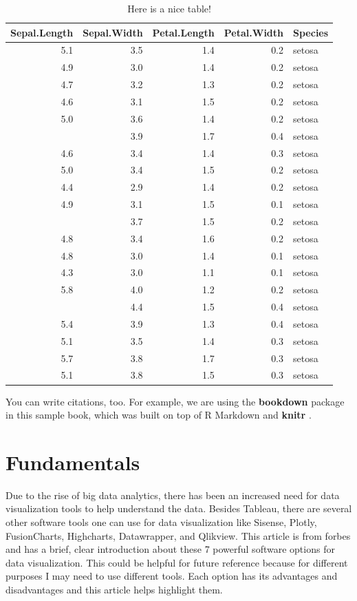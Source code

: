 \documentclass[]{book}
\theoremstyle{definition}
\theoremstyle{definition}
\theoremstyle{definition}
\theoremstyle{remark}
\begin{document}
\begin{table}

\caption{\label{tab:nice-tab}Here is a nice table!}
\centering
\begin{tabular}[t]{rrrrl}
\toprule
Sepal.Length & Sepal.Width & Petal.Length & Petal.Width & Species\\
\midrule
5.1 & 3.5 & 1.4 & 0.2 & setosa\\
4.9 & 3.0 & 1.4 & 0.2 & setosa\\
4.7 & 3.2 & 1.3 & 0.2 & setosa\\
4.6 & 3.1 & 1.5 & 0.2 & setosa\\
5.0 & 3.6 & 1.4 & 0.2 & setosa\\
\addlinespace
5.4 & 3.9 & 1.7 & 0.4 & setosa\\
4.6 & 3.4 & 1.4 & 0.3 & setosa\\
5.0 & 3.4 & 1.5 & 0.2 & setosa\\
4.4 & 2.9 & 1.4 & 0.2 & setosa\\
4.9 & 3.1 & 1.5 & 0.1 & setosa\\
\addlinespace
5.4 & 3.7 & 1.5 & 0.2 & setosa\\
4.8 & 3.4 & 1.6 & 0.2 & setosa\\
4.8 & 3.0 & 1.4 & 0.1 & setosa\\
4.3 & 3.0 & 1.1 & 0.1 & setosa\\
5.8 & 4.0 & 1.2 & 0.2 & setosa\\
\addlinespace
5.7 & 4.4 & 1.5 & 0.4 & setosa\\
5.4 & 3.9 & 1.3 & 0.4 & setosa\\
5.1 & 3.5 & 1.4 & 0.3 & setosa\\
5.7 & 3.8 & 1.7 & 0.3 & setosa\\
5.1 & 3.8 & 1.5 & 0.3 & setosa\\
\bottomrule
\end{tabular}
\end{table}

You can write citations, too. For example, we are using the
\textbf{bookdown} package \citep{R-bookdown} in this sample book, which
was built on top of R Markdown and \textbf{knitr} \citep{xie2015}.

\chapter{Fundamentals}\label{fundamentals}

Due to the rise of big data analytics, there has been an increased need
for data visualization tools to help understand the data. Besides
Tableau, there are several other software tools one can use for data
visualization like Sisense, Plotly, FusionCharts, Highcharts,
Datawrapper, and Qlikview. This article is from forbes and has a brief,
clear introduction about these 7 powerful software options for data
visualization. This could be helpful for future reference because for
different purposes I may need to use different tools. Each option has
its advantages and disadvantages and this article helps highlight them.
\end{document}
